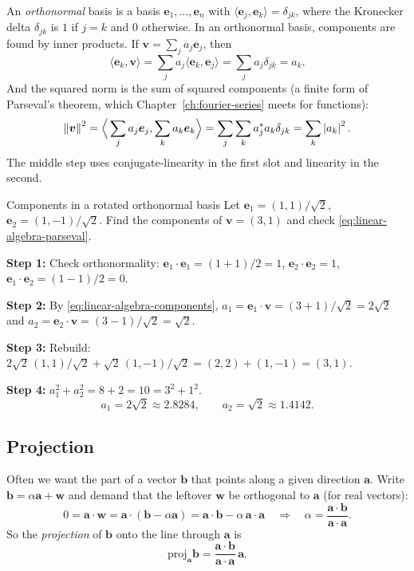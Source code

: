 An \emph{orthonormal} basis is a basis $\bm e_1,\dots,\bm e_n$ with $\langle\bm e_j,\bm e_k\rangle=\delta_{jk}$, where the Kronecker delta $\delta_{jk}$ is $1$ if $j=k$ and $0$ otherwise. In an orthonormal basis, components are found by inner products. If $\bm v=\sum_ja_j\bm e_j$, then
\begin{equation}
\langle\bm e_k,\bm v\rangle=\sum_ja_j\langle\bm e_k,\bm e_j\rangle=\sum_ja_j\delta_{jk}=a_k .
\label{eq:linear-algebra-components}
\end{equation}
And the squared norm is the sum of squared components (a finite form of Parseval's theorem, which Chapter~\ref{ch:fourier-series} meets for functions):
\begin{equation}
\left\lVert \bm v\right\rVert^2=\Big\langle\sum_ja_j\bm e_j,\sum_ka_k\bm e_k\Big\rangle=\sum_j\sum_ka_j^*a_k\delta_{jk}=\sum_k\left\lvert a_k\right\rvert^2 .
\label{eq:linear-algebra-parseval}
\end{equation}
The middle step uses conjugate-linearity in the first slot and linearity in the second.

\begin{sample}{Components in a rotated orthonormal basis}
Let $\bm e_1=(1,1)/\sqrt2$, $\bm e_2=(1,-1)/\sqrt2$. Find the components of $\bm v=(3,1)$ and check \cref{eq:linear-algebra-parseval}.

\textbf{Step 1:} Check orthonormality: $\bm e_1\cdot\bm e_1=(1+1)/2=1$, $\bm e_2\cdot\bm e_2=1$, $\bm e_1\cdot\bm e_2=(1-1)/2=0$.

\textbf{Step 2:} By \cref{eq:linear-algebra-components}, $a_1=\bm e_1\cdot\bm v=(3+1)/\sqrt2=2\sqrt2$ and $a_2=\bm e_2\cdot\bm v=(3-1)/\sqrt2=\sqrt2$.

\textbf{Step 3:} Rebuild: $2\sqrt2\,(1,1)/\sqrt2+\sqrt2\,(1,-1)/\sqrt2=(2,2)+(1,-1)=(3,1)$.

\textbf{Step 4:} $a_1^2+a_2^2=8+2=10=3^2+1^2$.
\[
\boxed{a_1=2\sqrt2\approx2.8284,\qquad a_2=\sqrt2\approx1.4142.}
\]
\end{sample}

\subsection{Projection}

Often we want the part of a vector $\bm b$ that points along a given direction $\bm a$. Write $\bm b=\alpha\bm a+\bm w$ and demand that the leftover $\bm w$ be orthogonal to $\bm a$ (for real vectors):
\[
0=\bm a\cdot\bm w=\bm a\cdot(\bm b-\alpha\bm a)=\bm a\cdot\bm b-\alpha\,\bm a\cdot\bm a
\quad\Longrightarrow\quad\alpha=\frac{\bm a\cdot\bm b}{\bm a\cdot\bm a}.
\]
So the \emph{projection} of $\bm b$ onto the line through $\bm a$ is
\begin{equation}
\mathrm{proj}_{\bm a}\bm b=\frac{\bm a\cdot\bm b}{\bm a\cdot\bm a}\,\bm a .
\label{eq:linear-algebra-proj}
\end{equation}

